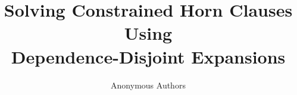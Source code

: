 \title{
  Solving Constrained Horn Clauses Using \\
  Dependence-Disjoint Expansions}
\author{Anonymous Authors}
\newcommand{\titlerunning}{Solving Constrained Horn Clauses Using
 Dependence-Disjoint Expansions}
\newcommand{\authorrunning}{Anonymous Authors}
